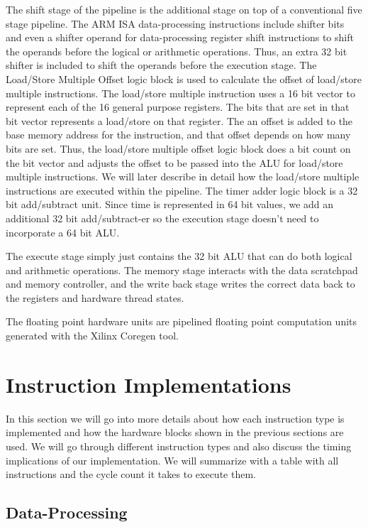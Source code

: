 The shift stage of the pipeline is the additional stage on top of a conventional five stage pipeline. 
The ARM ISA data-processing instructions include shifter bits and even a shifter operand for data-processing register shift instructions to shift the operands before the logical or arithmetic operations.
Thus, an extra 32 bit shifter is included to shift the operands before the execution stage. 
The Load/Store Multiple Offset logic block is used to calculate the offset of load/store multiple instructions.
The load/store multiple instruction uses a 16 bit vector to represent each of the 16 general purpose registers.
The bits that are set in that bit vector represents a load/store on that register.
The an offset is added to the base memory address for the instruction, and that offset depends on how many bits are set. 
Thus, the load/store multiple offset logic block does a bit count on the bit vector and adjusts the offset to be passed into the ALU for load/store multiple instructions.
We will later describe in detail how the load/store multiple instructions are executed within the pipeline.
The timer adder logic block is a 32 bit add/subtract unit. 
Since time is represented in 64 bit values, we add an additional 32 bit add/subtract-er so the execution stage doesn't need to incorporate a 64 bit ALU.

The execute stage simply just contains the 32 bit ALU that can do both logical and arithmetic operations. 
The memory stage interacts with the data scratchpad and memory controller, and the write back stage writes the correct data back to the registers and hardware thread states.

The floating point hardware units are pipelined floating point computation units generated with the Xilinx Coregen tool. 
 
\section{Instruction Implementations}
In this section we will go into more details about how each instruction type is implemented and how the hardware blocks shown in the previous sections are used.
We will go through different instruction types and also discuss the timing implications of our implementation. 
We will summarize with a table with all instructions and the cycle count it takes to execute them.   
\subsection{Data-Processing}

